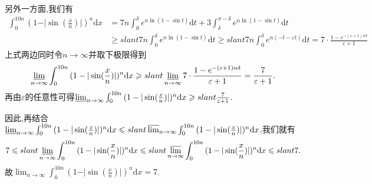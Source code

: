 \documentclass[../../main.tex]{subfiles}
\begin{document}
\begin{solution}
另外一方面,我们有
\begin{align*}
\int_0^{10n}{(1-\vert\sin(\frac{x}{n})\vert)^n}\mathrm{d}x&=7n\int_0^{\delta}{e^{n\ln(1-\sin t)}}\mathrm{d}t + 3\int_{\delta}^{\pi -\delta}{e^{n\ln(1-\sin t)}}\mathrm{d}t\\
&\geqslant slant 7n\int_0^{\delta}{e^{n\ln(1-\sin t)}}\mathrm{d}t\geqslant slant 7n\int_0^{\delta}{e^{n(-t-\varepsilon t)}}\mathrm{d}t=7\cdot\frac{1 - e^{-(\varepsilon +1)n\delta}}{\varepsilon +1}
\end{align*}
上式两边同时令\(n\rightarrow\infty\)并取下极限得到
\[
\varliminf_{n\rightarrow\infty}\int_0^{10n}{(1-\vert\sin(\frac{x}{n})\vert)^n}\mathrm{d}x\geqslant slant\varliminf_{n\rightarrow\infty}7\cdot\frac{1 - e^{-(\varepsilon +1)n\delta}}{\varepsilon +1}=\frac{7}{\varepsilon +1}.
\]
再由\(\varepsilon\)的任意性可得\(\varliminf_{n\rightarrow\infty}\int_0^{10n}{(1-\vert\sin(\frac{x}{n})\vert)^n}\mathrm{d}x\geqslant slant\frac{7}{\varepsilon +1}\).

因此,再结合\(\varliminf_{n\rightarrow\infty}\int_0^{10n}{(1-\vert\sin(\frac{x}{n})\vert)^n}\mathrm{d}x\leqslant slant\varlimsup_{n\rightarrow\infty}\int_0^{10n}{(1-\vert\sin(\frac{x}{n})\vert)^n}\mathrm{d}x\),我们就有
\[
7\leqslant slant\varliminf_{n\rightarrow\infty}\int_0^{10n}{(1-\vert\sin(\frac{x}{n})\vert)^n}\mathrm{d}x\leqslant slant\varlimsup_{n\rightarrow\infty}\int_0^{10n}{(1-\vert\sin(\frac{x}{n})\vert)^n}\mathrm{d}x\leqslant slant 7.
\]
故\(\lim_{n\rightarrow\infty}\int_0^{10n}{(1-\vert\sin(\frac{x}{n})\vert)^n}\mathrm{d}x = 7\).
\end{solution}
\end{document}
